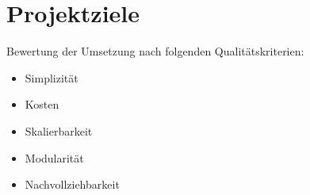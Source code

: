\documentclass[BMR,Bachelor,ngerman]{twbook}%
\begin{document}
\section{Projektziele}
Bewertung der Umsetzung nach folgenden Qualitätskriterien:
\begin{itemize}
	\item Simplizität
	\item Kosten
	\item Skalierbarkeit
	\item Modularität
	\item Nachvollziehbarkeit
\end{itemize}
\end{document}
